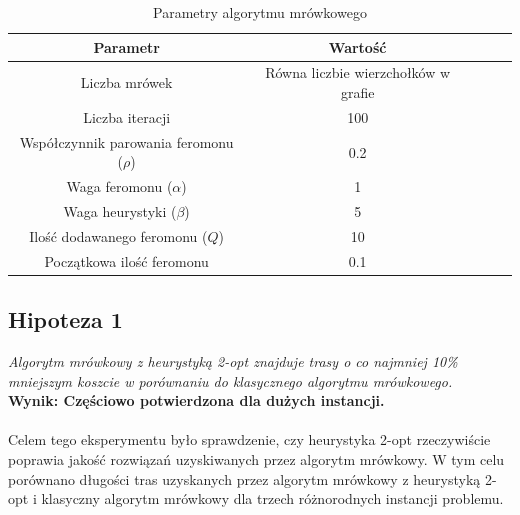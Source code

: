 \documentclass{article}
\begin{document}
\begin{table}[H]
    \label{tab:params}
    \centering
    \begin{tabular}{|c|c|c|c|c|}
        \hline
        \textbf{Parametr} & \textbf{Wartość} \\
        \hline
        Liczba mrówek & Równa liczbie wierzchołków w grafie \\
        \hline
        Liczba iteracji & 100 \\
        \hline
        Współczynnik parowania feromonu ($\rho$) & 0.2 \\
        \hline
        Waga feromonu ($\alpha$) & 1 \\
        \hline
        Waga heurystyki ($\beta$) & 5 \\
        \hline
        Ilość dodawanego feromonu ($Q$) & 10 \\
        \hline
        Początkowa ilość feromonu & 0.1 \\
        \hline
    \end{tabular}
    \caption{Parametry algorytmu mrówkowego}
    \label{tab:params}
\end{table}

\subsection{Hipoteza 1}
\textit{Algorytm mrówkowy z heurystyką 2-opt znajduje trasy o co najmniej 10\% mniejszym koszcie w porównaniu do klasycznego algorytmu mrówkowego.}
\\
\textbf{Wynik: Częściowo potwierdzona dla dużych instancji.} 
\\ \\
Celem tego eksperymentu było sprawdzenie, czy heurystyka 2-opt rzeczywiście poprawia jakość rozwiązań uzyskiwanych przez algorytm mrówkowy. W tym celu porównano długości tras uzyskanych przez algorytm mrówkowy z heurystyką 2-opt i klasyczny algorytm mrówkowy dla trzech różnorodnych instancji problemu.
\end{document}
